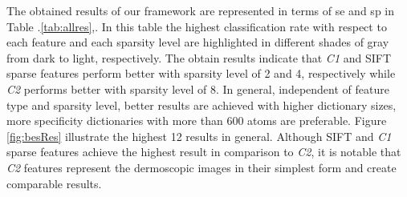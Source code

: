 The obtained results of our framework are represented in terms of \ac{se} and \ac{sp} in Table .\ref{tab:allres},. 
In this table the highest classification rate with respect to each feature and each sparsity level are highlighted in different shades of gray from dark to light, respectively. 
The obtain results indicate that \textit{C1} and SIFT sparse features perform better with sparsity level of 2 and 4, respectively while \textit{C2} performs better with sparsity level of 8. 
In general, independent of feature type and sparsity level, better results are achieved with higher dictionary sizes, more specificity dictionaries with more than 600 atoms are preferable. Figure \ref{fig:besRes} illustrate the highest 12 results in general. 
Although SIFT and \textit{C1} sparse features achieve the highest result in comparison to \textit{C2}, it is notable that \textit{C2} features represent the dermoscopic images in their simplest form and create comparable results. 

